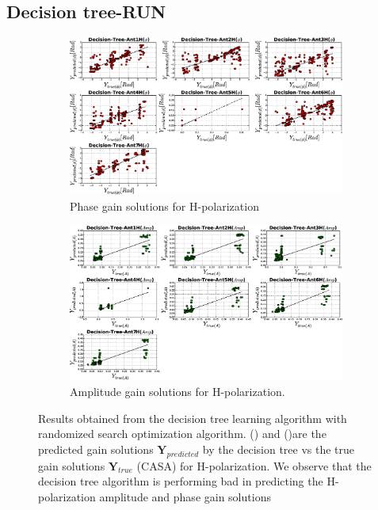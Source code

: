 \subsection{Decision tree-RUN}
\begin{figure}[H]
   \centering
    \begin{subfigure}[t]{0.52\textheight}
        
        \includegraphics[width=\textwidth]{images/Decision-TreeHphase.eps} 
        \caption{Phase gain solutions for H-polarization}
         \label{A}
    \end{subfigure}
    
      \begin{subfigure}[t]{0.52\textheight}
       
        \includegraphics[width=\textwidth]{images/Decision-TreeHamp.eps} 
        \caption{Amplitude gain solutions for H-polarization.}
         \label{B}
    \end{subfigure}
    \caption{Results obtained from the decision tree learning algorithm with randomized search optimization algorithm. () and ()are the predicted gain solutions $\textbf{Y}_{predicted}$ by the decision tree vs the true gain solutions $\textbf{Y}_{true}$ (CASA) for H-polarization. We observe that the decision tree algorithm is performing bad in predicting the H-polarization amplitude and phase gain solutions}
 \label{BB}
    \end{figure}
  
